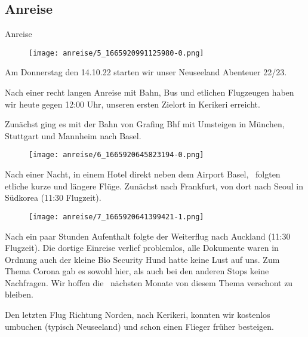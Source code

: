 \subsection{Anreise}

Anreise


\begin{figure}[H]
	\centering
	\texttt{[image: anreise/5\_1665920991125980-0.png]}
	\caption{}
	\label{fig:5_1665920991125980-0}
\end{figure}

  Am Donnerstag den 14.10.22 starten wir unser Neuseeland Abenteuer 22/23.
 


  Nach einer recht langen Anreise mit Bahn, Bus und etlichen Flugzeugen haben wir heute gegen 12:00 Uhr, unseren ersten Zielort in Kerikeri erreicht.
 


  Zunächst ging es mit der Bahn von Grafing Bhf mit Umsteigen in München, Stuttgart und Mannheim nach Basel.
 


\begin{figure}[H]
	\centering
	\texttt{[image: anreise/6\_1665920645823194-0.png]}
	\caption{}
	\label{fig:6_1665920645823194-0}
\end{figure}

  Nach einer Nacht, in einem Hotel direkt neben dem Airport Basel,  folgten etliche kurze und längere Flüge. Zunächst nach Frankfurt, von dort nach Seoul in Südkorea (11:30 Flugzeit).
 


\begin{figure}[H]
	\centering
	\texttt{[image: anreise/7\_1665920641399421-1.png]}
	\caption{}
	\label{fig:7_1665920641399421-1}
\end{figure}

  Nach ein paar Stunden Aufenthalt folgte der Weiterflug nach Auckland (11:30 Flugzeit). Die dortige Einreise verlief problemlos, alle Dokumente waren in Ordnung auch der kleine Bio Security Hund hatte keine Lust auf uns. Zum Thema Corona gab es sowohl hier, als auch bei den anderen Stops keine Nachfragen. Wir hoffen die  nächsten Monate von diesem Thema verschont zu bleiben.
 


  Den letzten Flug Richtung Norden, nach Kerikeri, konnten wir kostenlos umbuchen (typisch Neuseeland) und schon einen Flieger früher besteigen.
 


